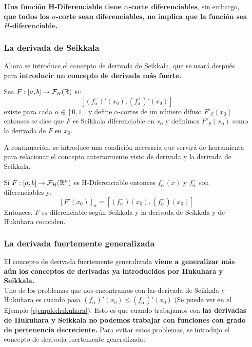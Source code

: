 \textbf{Una función H-Diferenciable tiene $\alpha$-corte diferenciables}, sin embargo, \textbf{que todos los $\alpha$-corte sean diferenciables, no implica que la función sea $H$-diferenciable.}

\subsubsection{La derivada de Seikkala}
Ahora se introduce el concepto de derivada de Seikkala, que se usará después para \textbf{introducir un concepto de derivada más fuerte.}

\begin{definicion}
	Sea $F: [a, b] \rightarrow \mathcal{F}_H(\mathbb R)$ si:
	\[
		[(f^-_\alpha)'(x_0), (f^+_\alpha)'(x_0)]
	\]
	existe para cada $\alpha \in [0, 1]$ y define $\alpha$-cortes de un número difuso $F'_S(x_0)$ entonces se dice que $F$ es Seikkala diferenciable en $x_0$ y definimos $F'_S(x_0)$ como la derivada de $F$ en $x_0$.
\end{definicion}

A continuación, se introduce una condición necesaria que servirá de herramienta para relacionar el concepto anteriormente visto de derivada y la derivada de Seikkala.

\begin{teorema}
	Si $F: [a, b] \rightarrow \mathcal{F}_\mathcal{H}(\mathbb R^n)$ es H-Diferenciable entonces $f_\alpha^-(x)$ y $f_\alpha^+$ son diferenciables y:
	\[
		[F'(x_0)]_\alpha = [(f_\alpha^-)(x_0), (f_\alpha^+)(x_0)]
	\]
	Entonces, $F$ es diferenciable según Seikkala y la derivada de Seikkala y de Hukuhara coinciden.
\end{teorema}

\subsubsection{La derivada fuertemente generalizada}
El concepto de derivada fuertemente generalizada \textbf{viene a generalizar más aún los conceptos de derivadas ya introducidos por Hukuhara y Seikkala.} \\
Uno de los problemas que nos encontramos con las derivada de Seikkala y Hukuhara es cuando pasa $(f^-_\alpha)'(x_0) \leq (f^+_\alpha)'(x_0)$ (Se puede ver en el Ejemplo \ref{ejemplo:hukuhara}). Esto es que cuando trabajamos con \textbf{las derivadas de Hukuhara y Seikkala no podemos trabajar con funciones con grado de pertenencia decreciente.} Para evitar estos problemas, se introdujo el concepto de derivada fuertemente generalizada:

